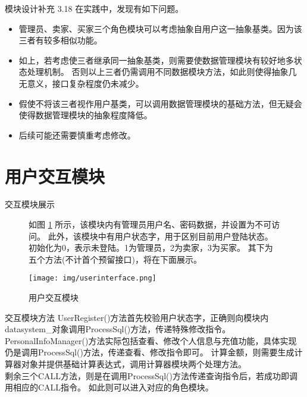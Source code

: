 \documentclass[10pt]{beamer}
\begin{document}
\begin{frame}{模块设计补充 3.18}
    在实践中，发现有如下问题。\\
    \begin{itemize}
        \item 管理员、卖家、买家三个角色模块可以考虑抽象自用户这一抽象基类。因为该三者有较多相似功能。
        \item 如上，若考虑使三者继承同一抽象基类，则需要使数据管理模块有较好地多状态处理机制。
              否则以上三者仍需调用不同数据模块方法，如此则使得抽象几无意义，接口复杂程度仍未减少。
        \item 假使不将该三者视作用户基类，可以调用数据管理模块的基础方法，但无疑会使得数据管理模块的抽象程度降低。
        \item 后续可能还需要慎重考虑修改。
    \end{itemize}
\end{frame}

\section{用户交互模块}

\begin{frame}{交互模块展示}
    \begin{figure}[HTB]
        \begin{minipage}{0.6\textwidth}
            如图 \ref{UserInterface} 所示，该模块内有管理员用户名、密码数据，并设置为不可访问。
            此外，该模块中有用户状态字，用于区别目前用户登陆状态。
            初始化为0，表示未登陆。1为管理员，2为卖家，3为买家。
            其下为五个方法(不计首个预留接口)，将在下面展示。
        \end{minipage}
        \begin{minipage}{0.3\textwidth}
            \centering
            \texttt{[image: img/userinterface.png]}
            \caption{用户交互模块}
            \label{UserInterface}
        \end{minipage}
    \end{figure}
\end{frame}

\begin{frame}{交互模块方法}
    UserRegister()方法首先校验用户状态字，正确则向模块内datasystem\_对象调用ProcessSql()方法，传递特殊修改指令。\\
    PersonalInfoManager()方法实际包括查看、修改个人信息与充值功能，具体实现仍是调用ProcessSql()方法，传递查看、修改指令即可。
    计算金额，则需要生成计算器对象并提供基础计算表达式，调用计算器模块两个处理方法。\\
    剩余三个CALL方法，则是在调用ProcessSql()方法传递查询指令后，若成功即调用相应的CALL指令。
    如此则可以进入对应的角色模块。\\
\end{frame}
\end{document}
